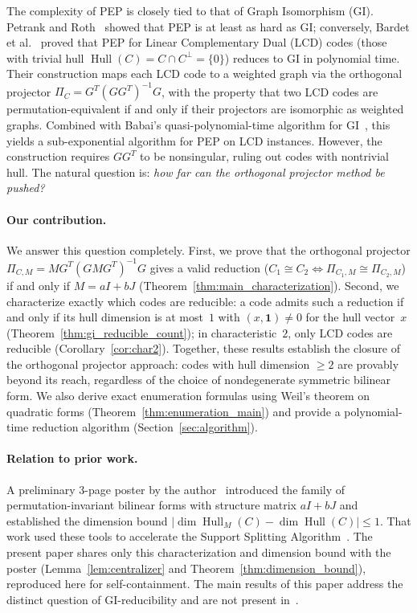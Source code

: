 \documentclass[11pt]{article}
\newcommand{\0}{\mathbf{0}}
\newcommand{\1}{\mathbf{1}}
\DeclareMathOperator{\Hull}{Hull}
\theoremstyle{plain}
\theoremstyle{definition}
\theoremstyle{remark}
\begin{document}
The complexity of PEP is closely tied to that of Graph Isomorphism (GI). Petrank and Roth~\cite{petrank1997finding} showed that PEP is at least as hard as GI; conversely, Bardet et al.~\cite{bardet2019permutation} proved that PEP for Linear Complementary Dual (LCD) codes (those with trivial hull $\Hull(C) = C \cap C^\perp = \{0\}$) reduces to GI in polynomial time. Their construction maps each LCD code to a weighted graph via the orthogonal projector $\Pi_C = G^T(GG^T)^{-1}G$, with the property that two LCD codes are permutation-equivalent if and only if their projectors are isomorphic as weighted graphs. Combined with Babai's quasi-polynomial-time algorithm for GI~\cite{babai2016}, this yields a sub-exponential algorithm for PEP on LCD instances. However, the construction requires $GG^T$ to be nonsingular, ruling out codes with nontrivial hull. The natural question is: \emph{how far can the orthogonal projector method be pushed?}

\paragraph{Our contribution.}
We answer this question completely. First, we prove that the orthogonal projector $\Pi_{C,M} = MG^T(GMG^T)^{-1}G$ gives a valid reduction ($C_1 \cong C_2 \Leftrightarrow \Pi_{C_1,M} \cong \Pi_{C_2,M}$) if and only if $M = aI + bJ$ (Theorem~\ref{thm:main_characterization}). Second, we characterize exactly which codes are reducible: a code admits such a reduction if and only if its hull dimension is at most~$1$ with $(x,\1) \neq 0$ for the hull vector~$x$ (Theorem~\ref{thm:gi_reducible_count}); in characteristic~$2$, only LCD codes are reducible (Corollary~\ref{cor:char2}). Together, these results establish the closure of the orthogonal projector approach: codes with hull dimension $\geq 2$ are provably beyond its reach, regardless of the choice of nondegenerate symmetric bilinear form. We also derive exact enumeration formulas using Weil's theorem on quadratic forms (Theorem~\ref{thm:enumeration_main}) and provide a polynomial-time reduction algorithm (Section~\ref{sec:algorithm}).

\paragraph{Relation to prior work.}
A preliminary 3-page poster by the author~\cite{ishizuka2025ccsposter} introduced the family of permutation-invariant bilinear forms with structure matrix $aI + bJ$ and established the dimension bound $|\dim \Hull_M(C) - \dim \Hull(C)| \leq 1$. That work used these tools to accelerate the Support Splitting Algorithm~\cite{sendrier2000finding}. The present paper shares only this characterization and dimension bound with the poster (Lemma~\ref{lem:centralizer} and Theorem~\ref{thm:dimension_bound}), reproduced here for self-containment. The main results of this paper address the distinct question of GI-reducibility and are not present in~\cite{ishizuka2025ccsposter}.
\end{document}
